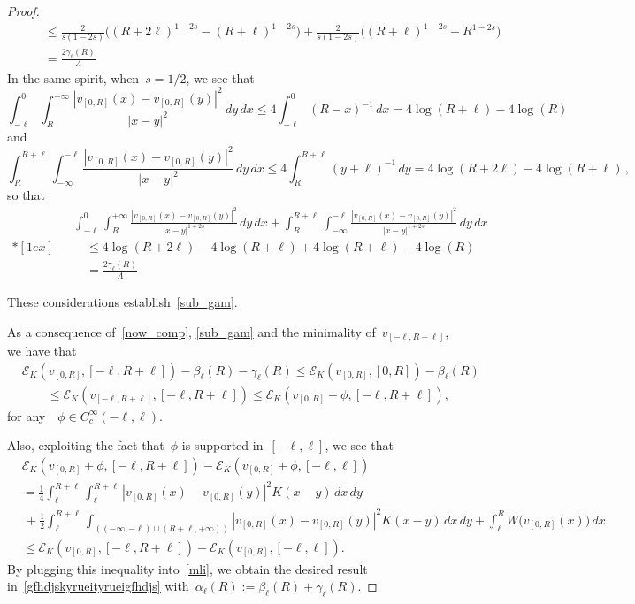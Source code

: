 \documentclass[10pt,a4paper]{amsart}
\numberwithin{equation}{section}
\newcommand{\Ec}{\mathcal{E}_K}
\begin{document}
\begin{proof}
\begin{eqnarray*}
&&\quad  \leq \frac{2}{s(1-2s)} \big( (R+2\ell)^{1-2s}-(R+\ell)^{1-2s}\big) +\frac{2}{s(1-2s)} \big( (R+\ell)^{1-2s}-R^{1-2s}\big)\\
&& \quad = \frac{2\gamma_{\ell}(R)}{\Lambda}
\end{eqnarray*}
In the same spirit, when~$s=1/2$, we see that
\begin{equation*}
\int_{-\ell}^0 \int_R^{+\infty}\frac{|v_{[0,R]}(x)-v_{[0,R]}(y)|^2}{|x-y|^{2}} \, dy \, dx \leq 4 \int_{-\ell}^0 (R-x)^{-1} \, dx = 4 \log(R+\ell) -4\log(R)
\end{equation*}
and
\begin{equation*}
\int_{R}^{R+\ell} \int_{-\infty}^{-\ell}\frac{|v_{[0,R]}(x)-v_{[0,R]}(y)|^2}{|x-y|^{2}} \, dy \, dx \leq 4 \int_{R}^{R+\ell} (y+\ell)^{-1} \, dy = 4\log(R+2\ell)-4\log(R+\ell)\,,
\end{equation*}
so that
\begin{eqnarray*}
	&& \int_{-\ell}^0 \int_R^{+\infty}\frac{| v_{[0,R]}(x)-v_{[0,R]}(y)|^2}{|x-y|^{1+2s}} \, dy \, dx + \int_{R}^{R+\ell}\int_{-\infty}^{-\ell}\frac{| v_{[0,R]}(x)-v_{[0,R]}(y)|^2}{|x-y|^{1+2s}} \, dy \, dx \\*[1ex]
	&&\quad  \leq 4\log(R+2\ell)-4\log(R+\ell) + 4 \log(R+\ell) -4\log(R) \\
	&& \quad = \frac{2\gamma_{\ell}(R)}{\Lambda}
\end{eqnarray*}

These considerations establish~\eqref{sub_gam}.

As a consequence of~\eqref{now_comp}, \eqref{sub_gam} and the minimality of~$v_{[-\ell,R+\ell]}$, we have that
\begin{equation}\label{mli}\begin{split}
&\Ec (v_{[0,R]}, [-\ell,R+\ell]) - \beta_{\ell}(R)-\gamma_{\ell}(R) 
\le  \Ec (v_{[0,R]}, [0,R])- \beta_{\ell}(R)
\\&\qquad\le \Ec(v_{[-\ell,R+\ell]}, [-\ell,R+\ell])
\leq \Ec(v_{[0,R]}+\phi,[-\ell,R+\ell] ),
\end{split}
\end{equation}
for any~~$\phi \in C^{\infty}_c(-\ell,\ell)$. 

Also, exploiting the fact that~$\phi$ is supported in~$[-\ell,\ell]$, we see that
\begin{align*}
&\Ec(v_{[0,R]}+\phi, [-\ell,R+\ell])- \Ec(v_{[0,R]}+\phi, [-\ell,\ell]) \\
&= \frac{1}{4} \int_{\ell}^{R+\ell}\int_{\ell}^{R+\ell}|v_{[0,R]}(x)-v_{[0,R]}(y)|^2 K(x-y)\, dx\,dy \\
&\,+ \frac{1}{2} \int_{\ell}^{R+\ell}\int_{(
(-\infty,-\ell)\cup(R+\ell,+\infty))} |v_{[0,R]}(x)-v_{[0,R]}(y)|^2 K(x-y)\, dx\,dy + \int_{\ell}^{R}W\big(v_{[0,R]}(x)\big)\, dx \\
&\le \Ec(v_{[0,R]}, [-\ell,R+\ell])- \Ec(v_{[0,R]}, [-\ell,\ell]).
\end{align*}
By plugging this inequality into~\eqref{mli}, we obtain the desired result
in~\eqref{gfhdjskyrueityrueigfhdjs}
with~$\alpha_{\ell}(R):= \beta_{\ell}(R)+\gamma_{\ell}(R)$.


\end{proof}
\end{document}
